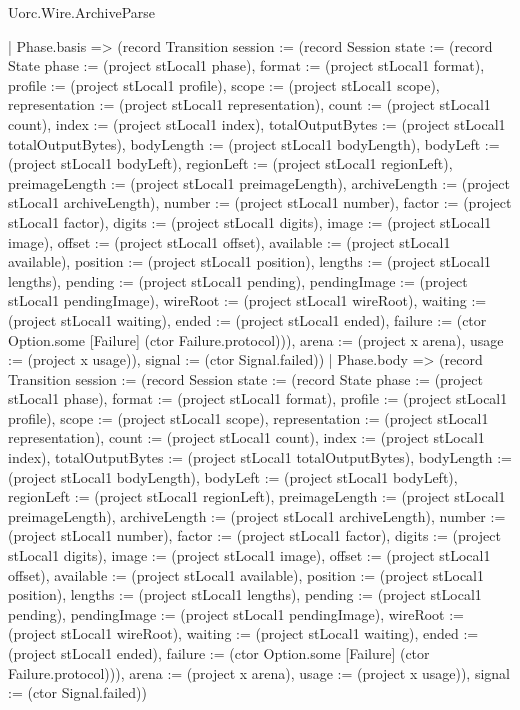 \begin{lexlean}{Uorc.Wire.ArchiveParse}
\begin{semanticmodule}
{    | Phase.basis => (record Transition {session := (record Session {state := (record State {phase := (project stLocal1 phase), format := (project stLocal1 format), profile := (project stLocal1 profile), scope := (project stLocal1 scope), representation := (project stLocal1 representation), count := (project stLocal1 count), index := (project stLocal1 index), totalOutputBytes := (project stLocal1 totalOutputBytes), bodyLength := (project stLocal1 bodyLength), bodyLeft := (project stLocal1 bodyLeft), regionLeft := (project stLocal1 regionLeft), preimageLength := (project stLocal1 preimageLength), archiveLength := (project stLocal1 archiveLength), number := (project stLocal1 number), factor := (project stLocal1 factor), digits := (project stLocal1 digits), image := (project stLocal1 image), offset := (project stLocal1 offset), available := (project stLocal1 available), position := (project stLocal1 position), lengths := (project stLocal1 lengths), pending := (project stLocal1 pending), pendingImage := (project stLocal1 pendingImage), wireRoot := (project stLocal1 wireRoot), waiting := (project stLocal1 waiting), ended := (project stLocal1 ended), failure := (ctor Option.some [Failure] (ctor Failure.protocol))}), arena := (project x arena), usage := (project x usage)}), signal := (ctor Signal.failed)})
    | Phase.body => (record Transition {session := (record Session {state := (record State {phase := (project stLocal1 phase), format := (project stLocal1 format), profile := (project stLocal1 profile), scope := (project stLocal1 scope), representation := (project stLocal1 representation), count := (project stLocal1 count), index := (project stLocal1 index), totalOutputBytes := (project stLocal1 totalOutputBytes), bodyLength := (project stLocal1 bodyLength), bodyLeft := (project stLocal1 bodyLeft), regionLeft := (project stLocal1 regionLeft), preimageLength := (project stLocal1 preimageLength), archiveLength := (project stLocal1 archiveLength), number := (project stLocal1 number), factor := (project stLocal1 factor), digits := (project stLocal1 digits), image := (project stLocal1 image), offset := (project stLocal1 offset), available := (project stLocal1 available), position := (project stLocal1 position), lengths := (project stLocal1 lengths), pending := (project stLocal1 pending), pendingImage := (project stLocal1 pendingImage), wireRoot := (project stLocal1 wireRoot), waiting := (project stLocal1 waiting), ended := (project stLocal1 ended), failure := (ctor Option.some [Failure] (ctor Failure.protocol))}), arena := (project x arena), usage := (project x usage)}), signal := (ctor Signal.failed)})
}
\end{semanticmodule}
\end{lexlean}
